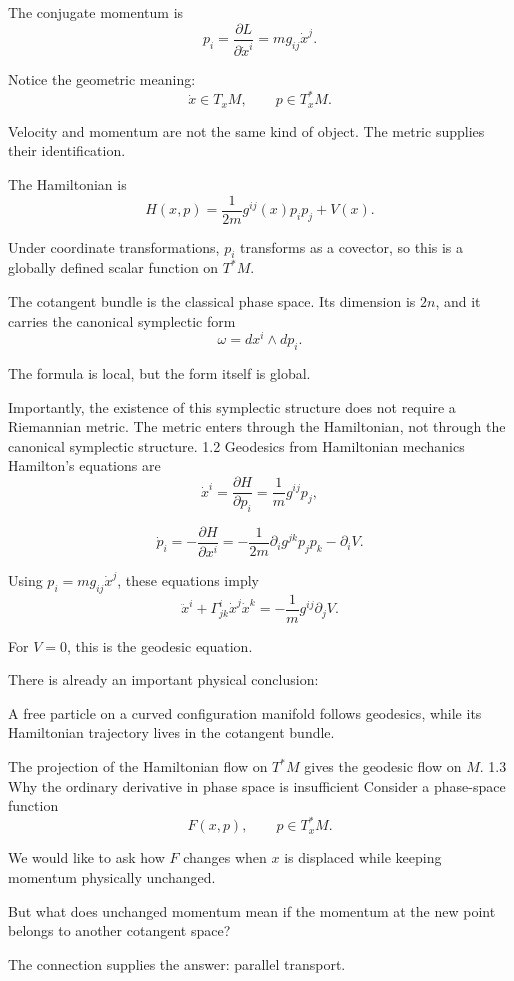 The conjugate momentum is
\[
p_i=\frac{\partial L}{\partial\dot x^i}
=mg_{ij}\dot x^j.
\tag{2}
\]

Notice the geometric meaning:
\[
\dot x\in T_xM,\qquad p\in T_x^*M.
\]

Velocity and momentum are not the same kind of object. The metric supplies their identification.

The Hamiltonian is
\[
\boxed{
H(x,p)=\frac{1}{2m}g^{ij}(x)p_ip_j+V(x).
}
\tag{3}
\]

Under coordinate transformations, \(p_i\) transforms as a covector, so this is a globally defined scalar function on \(T^*M\).

The cotangent bundle is the classical phase space. Its dimension is \(2n\), and it carries the canonical symplectic form
\[
\omega=dx^i\wedge dp_i.
\tag{4}
\]

The formula is local, but the form itself is global.

Importantly, the existence of this symplectic structure does not require a Riemannian metric. The metric enters through the Hamiltonian, not through the canonical symplectic structure.
1.2 Geodesics from Hamiltonian mechanics
Hamilton's equations are
\[
\dot x^i=\frac{\partial H}{\partial p_i}
=\frac1m g^{ij}p_j,
\tag{5}
\]

\[
\dot p_i=-\frac{\partial H}{\partial x^i}
=-\frac1{2m}\partial_i g^{jk}p_jp_k-\partial_iV.
\tag{6}
\]

Using \(p_i=mg_{ij}\dot x^j\), these equations imply
\[
\boxed{
\ddot x^i+
\Gamma^i_{jk}\dot x^j\dot x^k
=-\frac1m g^{ij}\partial_jV.
}
\tag{7}
\]

For \(V=0\), this is the geodesic equation.

There is already an important physical conclusion:

A free particle on a curved configuration manifold follows geodesics, while its Hamiltonian trajectory lives in the cotangent bundle.

The projection of the Hamiltonian flow on \(T^*M\) gives the geodesic flow on \(M\).
1.3 Why the ordinary derivative in phase space is insufficient
Consider a phase-space function
\[
F(x,p),\qquad p\in T_x^*M.
\]

We would like to ask how \(F\) changes when \(x\) is displaced while keeping momentum physically unchanged.

But what does unchanged momentum mean if the momentum at the new point belongs to another cotangent space?

The connection supplies the answer: parallel transport.

